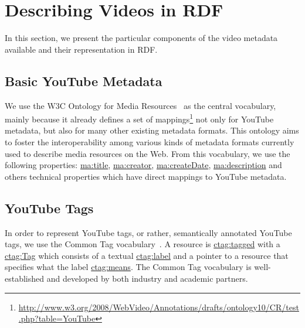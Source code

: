 \documentclass[conference]{IEEEtran}
\begin{document}
\section{Describing Videos in RDF}                                          \label{sec:representing}
In this section, we present the particular components of the video metadata available and their representation in RDF.

\subsection{Basic YouTube Metadata}                                         \label{sec:metadata}
We use the W3C Ontology for Media Resources~\cite{W3C:MediaOntology} as the central vocabulary, mainly because it
already defines a set of
mappings\footnote{\url{http://www.w3.org/2008/WebVideo/Annotations/drafts/ontology10/CR/test.php?table=YouTube}} not
only for YouTube metadata, but also for many other existing metadata formats. This ontology aims to foster the
interoperability among various kinds of metadata formats currently used to describe media resources on the Web. From
this vocabulary, we use the following properties: \url{ma:title}, \url{ma:creator}, \url{ma:createDate},
\url{ma:description} and others technical properties which have direct mappings to YouTube metadata.

\subsection{YouTube Tags}                                                   \label{sec:youtube}
In order to represent YouTube tags, or rather, semantically annotated YouTube tags, we use the Common Tag
vocabulary~\cite{CommonTag:Spec}. A resource is \url{ctag:tagged} with a \url{ctag:Tag} which consists of a textual
\url{ctag:label} and a pointer to a resource that specifies what the label \url{ctag:means}. The Common Tag vocabulary
is well-established and developed by both industry and academic partners.

\end{document}
